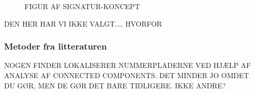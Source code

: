 \begin{figure}[htp]
  \centering
  \caption{FIGUR AF SIGNATUR-KONCEPT}
  \label{fig:ptv-signatur}
\end{figure}

DEN HER HAR VI IKKE VALGT.... HVORFOR

\subsubsection{Metoder fra litteraturen}

NOGEN FINDER LOKALISERER NUMMERPLADERNE VED HJÆLP AF ANALYSE AF CONNECTED COMPONENTS. DET MINDER JO OMDET DU GØR, MEN DE GØR DET BARE TIDLIGERE.
IKKE ANDRE?

